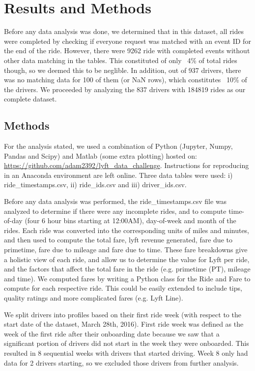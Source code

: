 \documentclass{report}
\begin{document}
\section{Results and Methods}
	Before any data analysis was done, we determined that in this dataset, all rides were completed by checking if everyone request was matched with an event ID for the end of the ride. However, there were 9262 ride with completed events without other data matching in the tables. This constituted of only ~4\% of total rides though, so we deemed this to be neglible. In addition, out of 937 drivers, there was no matching data for 100 of them (or NaN rows), which constitutes ~10\% of the drivers. We proceeded by analyzing the 837 drivers with 184819 rides as our complete dataset.

	\subsection{Methods}
		For the analysis stated, we used a combination of Python (Jupyter, Numpy, Pandas and Scipy) and Matlab (some extra plotting) hosted on: \href{https://github.com/adam2392/lyft_data_challenge}{https://github.com/adam2392/lyft\_data\_challenge}. Instructions for reproducing in an Anaconda environment are left online. Three data tables were used: i) ride\_timestamps.csv, ii) ride\_ids.csv and iii) driver\_ids.csv.

		Before any data analysis was performed, the ride\_timestamps.csv file was analyzed to determine if there were any incomplete rides, and to compute time-of-day (four 6 hour bins starting at 12:00AM), day-of-week and month of the rides. Each ride was converted into the corresponding units of miles and minutes, and then used to compute the total fare, lyft revenue generated, fare due to primetime, fare due to mileage and fare due to time. These fare breakdowns give a holistic view of each ride, and allow us to determine the value for Lyft per ride, and the factors that affect the total fare in the ride (e.g. primetime (PT), mileage and time). We computed fares by writing a Python class for the Ride and Fare to compute for each respective ride. This could be easily extended to include tips, quality ratings and more complicated fares (e.g. Lyft Line). 

		We split drivers into profiles based on their first ride week (with respect to the start date of the dataset, March 28th, 2016). First ride week was defined as the week of the first ride after their onboarding date because we saw that a significant portion of drivers did not start in the week they were onboarded. This resulted in 8 sequential weeks with drivers that started driving. Week 8 only had data for 2 drivers starting, so we excluded those drivers from further analysis.
\end{document}
